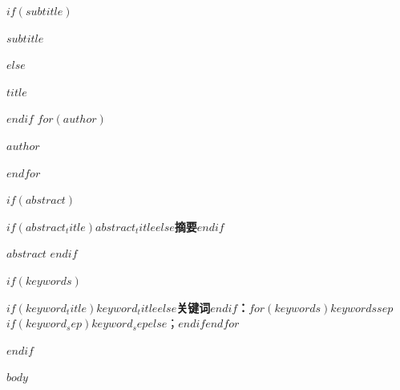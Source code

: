 \documentclass[11pt,a4paper]{article}
\newcommand{\cnmaintitle}[1]{{\fontsize{20}{28}\selectfont\bfseries #1\par}}
\newcommand{\cnsubtitle}[1]{\vspace{0.45em}{\large #1\par}}
\newcommand{\cnkeywords}[2]{\par\vspace{0.5em}\noindent\textbf{#1：}#2\par}
\begin{document}
\begin{center}
$if(subtitle)$
  \cnmaintitle{$subtitle$}
  \cnsubtitle{$title$}
$else$
  \cnmaintitle{$title$}
$endif$
  \vspace{0.8em}
$for(author)$
  {\normalsize $author$\par}
$endfor$
\end{center}

$if(abstract)$
\vspace{0.8em}
\begin{center}
{\normalsize\bfseries $if(abstract_title)$$abstract_title$$else$摘要$endif$}
\end{center}
\noindent $abstract$
$endif$

$if(keywords)$
\cnkeywords{$if(keyword_title)$$keyword_title$$else$关键词$endif$}{$for(keywords)$$keywords$$sep$$if(keyword_sep)$$keyword_sep$$else$；$endif$$endfor$}
$endif$

\vspace{0.8em}

$body$
\end{document}
